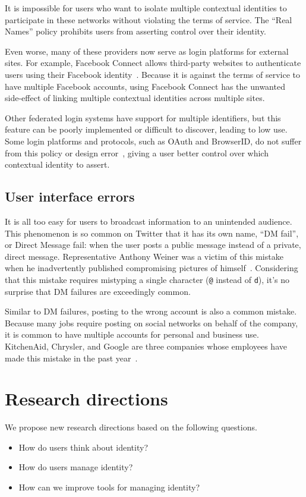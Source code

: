 \documentclass[10pt, conference, compsocconf]{IEEEtran}
\begin{document}
It is impossible for users who want to isolate multiple contextual identities
to participate in these networks without violating the terms of service.  The
``Real Names'' policy prohibits users from asserting control over their
identity.

Even worse, many of these providers now serve as login platforms for external
sites. For example, Facebook Connect allows third-party websites to
authenticate users using their Facebook identity~\cite{fb_connect}.  Because it
is against the terms of service to have multiple Facebook accounts, using
Facebook Connect has the unwanted side-effect of linking multiple contextual
identities across multiple sites.

Other federated login systems have support for multiple identifiers, but this
feature can be poorly implemented or difficult to discover, leading to low use.
Some login platforms and protocols, such as OAuth and BrowserID, do not suffer
from this policy or design error~\cite{browserid,oauth}, giving a user better
control over which contextual identity to assert.

\subsection{User interface errors}
It is all too easy for users to broadcast information to
an unintended audience. This phenomenon is so common on Twitter that it has its
own name, ``DM fail'', or Direct Message fail: when the user posts a public
message instead of a private, direct message. Representative Anthony Weiner was
a victim of this mistake when he inadvertently published compromising pictures
of himself~\cite{weiner}. Considering that this mistake requires
mistyping a single character (\texttt{@} instead of \texttt{d}), it's no
surprise that DM failures are exceedingly common.

Similar to DM failures, posting to the wrong account is also a common mistake.
Because many jobs require posting on social networks on behalf of the company,
it is common to have multiple accounts for personal and business use.
KitchenAid, Chrysler, and Google are three companies whose employees have
made this mistake in the past year~\cite{kitchenaid,chrysler,yegge}.

\section{Research directions}
We propose new research directions based on the following questions.
\begin{itemize}
\item How do users think about identity?
\item How do users manage identity?
\item How can we improve tools for managing identity?
\end{itemize}
\end{document}
